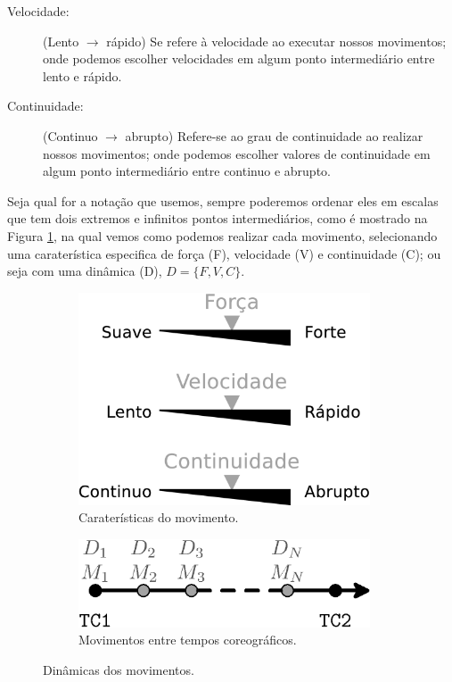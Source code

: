 \begin{description}
\item[Velocidade:] (Lento $\rightarrow$ rápido)
Se refere à velocidade ao executar nossos movimentos;
onde podemos escolher velocidades em algum ponto intermediário entre lento e rápido. 
\item[Continuidade:] (Continuo $\rightarrow$ abrupto)
Refere-se ao grau de continuidade ao realizar nossos movimentos;
onde podemos escolher valores de continuidade em algum ponto intermediário entre continuo e abrupto.
\end{description}
Seja qual for a notação que usemos, sempre poderemos ordenar eles em escalas
que tem dois extremos e infinitos pontos intermediários,
como é mostrado na Figura \ref{fig:element:moviment},
na qual vemos como podemos realizar cada movimento, 
selecionando uma caraterística especifica de força (F), 
velocidade (V) e continuidade (C);
ou seja com uma dinâmica (D),  $D=\{F, V, C\}$.
\begin{figure}[!h]
\centering
    \begin{subfigure}[b]{0.45\textwidth}
    \centering
    \includegraphics[width=0.95\textwidth]{chapters/cap-musicalidade/dinamicas-elementos1.eps}
    \caption{Caraterísticas do movimento.}
    \label{fig:element:moviment}
    \end{subfigure}
    \hfill
    \begin{subfigure}[b]{0.5\textwidth}
    \centering
    \includegraphics[width=0.95\textwidth]{chapters/cap-musicalidade/dinamicas-elementos1b.eps}
    \caption{Movimentos entre tempos coreográficos.}
    \label{fig:coreografia:moviment}
    \end{subfigure}
\caption{Dinâmicas dos movimentos.}
\label{fig:geral:moviment}
\end{figure}
